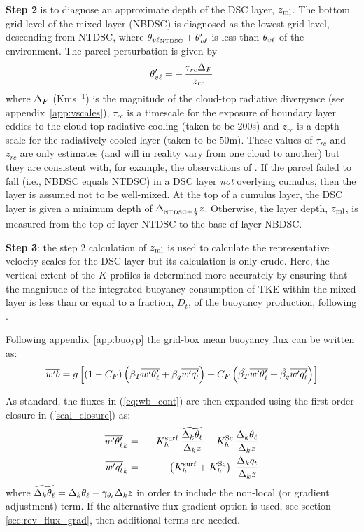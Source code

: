 \documentclass{UMDP_article}
\begin{document}
{\bf Step 2} is to diagnose an approximate depth of the DSC layer,
$z_{\rm ml}$.  The bottom grid-level of the mixed-layer (NBDSC) is diagnosed
as the lowest grid-level, descending from NTDSC, where
${\theta_{v\ell}}_{\mbox{\tiny \rm NTDSC}} + \theta_{v\ell}'$ is less than $\theta_{v\ell}$ of the
environment.  The parcel perturbation is given by
\begin{equation}
  \theta_{v\ell}' = - \, \frac{ \tau_{rc} \Delta_F }{z_{rc}}
  \label{dscd_pert}
\end{equation}
where $\Delta_F$ (Kms$^{-1}$) is the magnitude of the cloud-top
radiative divergence (see appendix~\ref{app:vscales}), $\tau_{rc}$ is
a timescale for the exposure of boundary layer eddies to the cloud-top
radiative cooling (taken to be 200s) and $z_{rc}$ is a depth-scale for
the radiatively cooled layer (taken to be 50m).  These values of
$\tau_{rc}$ and $z_{rc}$ are only estimates (and will in reality vary
from one cloud to another) but they are consistent with, for example,
the observations of \cite{nicholls1986}.  If the parcel failed to fall
(\mbox{i.e.}, NBDSC equals NTDSC) in a DSC layer {\em not} overlying
cumulus, then the layer is assumed not to be well-mixed.  At the top
of a cumulus layer, the DSC layer is given a minimum depth of
$\Delta_{\mbox{\tiny \rm NTDSC}+\frac{1}{2}} z$.  Otherwise, the layer depth, $z_{\rm ml}$,
is measured from the top of layer NTDSC to the base of layer NBDSC.

{\bf Step 3}: the step 2 calculation of $z_{\rm ml}$ is used to calculate
the representative velocity scales for the DSC layer but its
calculation is only crude.  Here, the vertical extent of the
$K$-profiles is determined more accurately by ensuring that the
magnitude of the integrated buoyancy consumption of TKE within the
mixed layer is less than or equal to a fraction, $D_t$, of the
buoyancy production, following \cite{turton1987}.

Following appendix~\ref{app:buoyp} the grid-box mean buoyancy flux can
be written as:
\begin{equation}
  \overline{w'b} = g \left[ (1-C_F) \left(\beta_T \overline{w'\theta_{\ell}'} + \beta_q \overline{w'q_t'} \right) +
    C_F \left( \tilde{\beta_T} \overline{w'\theta_{\ell}'} + \tilde{\beta_q} \overline{w'q_t'} \right) 
  \right]
  \label{eq:wb_cont}
\end{equation}

As standard, the fluxes in (\ref{eq:wb_cont}) are then expanded using
the first-order closure in (\ref{scal_closure}) as:
\begin{eqnarray}
  \overline{w'\theta_{\ell}'}_k &=&  -K_h^{\rm surf} \,\frac{\widetilde{\Delta_k \theta_{\ell}}}{\Delta_k z}
               -K_h^{\rm Sc} \,\frac{\Delta_k \theta_{\ell}}{\Delta_k z} \nonumber \\
  \overline{w'q_t'}_k  &=&  -\left(K_h^{\rm surf} + K_h^{\rm Sc} \right) \,
               \,\frac{\Delta_k q_t}{\Delta_k z} 
  \label{eq:wx_std}
\end{eqnarray}
where $\widetilde{\Delta_k \theta_{\ell}} = \Delta_k \theta_{\ell} -
\gamma_{\theta_{\ell}} \Delta_k z$ in order to include the non-local (or
gradient adjustment) term.  If the alternative flux-gradient option is
used, see section \ref{sec:rev_flux_grad}, then additional terms are
needed.
\end{document}
